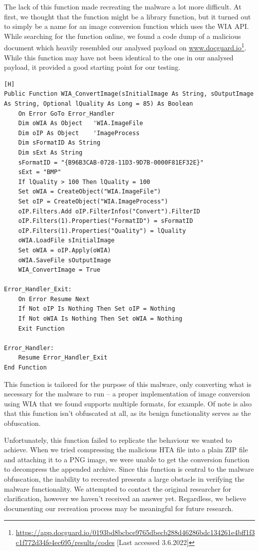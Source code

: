 The lack of this function made recreating the malware a lot more difficult. At first, we thought that the function might
be a library function, but it turned out to simply be a name for an image conversion function which uses the
\acrfull{WIA} \acrshort{API}. While searching for the function online, we found a code dump of a malicious document which
heavily resembled our analysed payload on \url{www.docguard.io}\footnote{\url{
https://app.docguard.io/0193bd8bcbce9765dbecb288d46286bdc134261e4bff1f3c1f772d34fe4ec695/results/codes}
[Last accessed 3.6.2022]}. While this function may have not been identical to the one in our analysed payload, it
provided a good starting point for our testing. %

\begin{lstlisting}[language=VBScript, caption={The image conversion function obtained from a source code dump.}][H]
Public Function WIA_ConvertImage(sInitialImage As String, sOutputImage As String, Optional lQuality As Long = 85) As Boolean
    On Error GoTo Error_Handler
    Dim oWIA As Object   'WIA.ImageFile
    Dim oIP As Object    'ImageProcess
    Dim sFormatID As String
    Dim sExt As String
    sFormatID = "{B96B3CAB-0728-11D3-9D7B-0000F81EF32E}"
    sExt = "BMP"
    If lQuality > 100 Then lQuality = 100
    Set oWIA = CreateObject("WIA.ImageFile")
    Set oIP = CreateObject("WIA.ImageProcess")
    oIP.Filters.Add oIP.FilterInfos("Convert").FilterID
    oIP.Filters(1).Properties("FormatID") = sFormatID
    oIP.Filters(1).Properties("Quality") = lQuality
    oWIA.LoadFile sInitialImage
    Set oWIA = oIP.Apply(oWIA)
    oWIA.SaveFile sOutputImage
    WIA_ConvertImage = True

Error_Handler_Exit:
    On Error Resume Next
    If Not oIP Is Nothing Then Set oIP = Nothing
    If Not oWIA Is Nothing Then Set oWIA = Nothing
    Exit Function

Error_Handler:
    Resume Error_Handler_Exit
End Function
\end{lstlisting}

This function is tailored for the purpose of this malware, only converting what is necessary for the malware to run -- 
a proper implementation of image conversion using \acrshort{WIA} that we found supports multiple formats, for example. 
Of note is also that this function isn't obfuscated at all, as its benign functionality serves as the obfuscation. 

Unfortunately, this function failed to replicate the behaviour we wanted to achieve. When we tried compressing the
malicious \acrfull{HTA} file into a plain ZIP file and attaching it to a \acrshort{PNG} image, we were unable to get the conversion
function to decompress the appended archive. Since this function is central to the malware obfuscation, the inability to
recreated presents a large obstacle in verifying the malware functionality. We attempted to contact the original
researcher for clarification, however we haven't received an answer yet. %
Regardless, we believe documenting our recreation process may be meaningful for future research.

